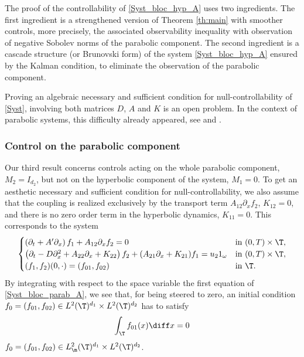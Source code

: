The proof of the controllability of \eqref{Syst_bloc_hyp_A} uses two ingredients. The first ingredient is a strengthened version of Theorem \ref{th:main} with smoother controls, more precisely, the associated observability inequality with observation of negative Sobolev norms of the parabolic component. The second ingredient is a cascade structure (or Brunovski form) of the system \eqref{Syst_bloc_hyp_A} ensured by the Kalman condition, to eliminate the observation of the parabolic component.

Proving an algebraic necessary and sufficient condition for null-controllability of \eqref{Syst}, involving both matrices $D$, $A$ and $K$ is an open problem.
In the context of parabolic systems, this difficulty already appeared, see
\cite{ammarkhodja_2009} and \cite{duprez_2016a}.

\subsubsection{Control on the parabolic component}

Our third result concerns controls acting on the whole parabolic component, $M_2=I_{d_2}$, but not on the hyperbolic component of the system, $M_1=0$. To get an aesthetic necessary and sufficient condition for null-controllability, we also assume that the coupling is realized exclusively by the transport term $A_{12}\partial_x f_2$, \ie $K_{12}=0$, and there is no zero order term in the hyperbolic dynamics, \ie $K_{11}=0$. This corresponds to the system
\begin{equation} \label{Syst_bloc_parab_A}
\begin{cases}
\left(\partial_t +A'\partial_x \right)f_1+ A_{12}\partial_x f_2= 0
&\text{in}\ (0,T)\times \T,\\
\left(\partial_t - D \partial_x^2+A_{22}\partial_x+K_{22}\right)f_2 + (A_{21}\partial_x + K_{21}) f_1 = u_2 1_\omega &\text{in}\ (0,T)\times \T,\\
(f_1,f_2)(0,\cdot)=(f_{01},f_{02}) & \text{in}\ \T.
\end{cases}
\end{equation}
By integrating with respect to the space variable the first equation of \eqref{Syst_bloc_parab_A}, we see that, for being steered to zero, an initial condition $f_0=(f_{01},f_{02})\in L^2(\T)^{d_1} \times L^2(\T)^{d_2}$ has to satisfy
\begin{equation} \label{Hyp_A_contrainte_parab}
\int_{\T} f_{01}(x) \diff x =0
\end{equation}
\ie $f_0=(f_{01},f_{02})\in L^2_\m(\T)^{d_1} \times L^2(\T)^{d_2}$.

